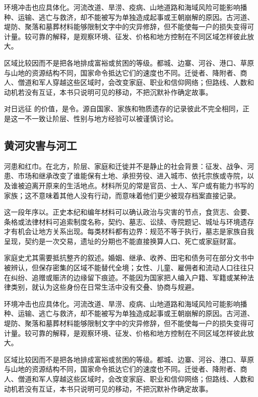 环境冲击也应具体化。河流改道、旱涝、疫病、山地道路和海域风险可能影响播种、运输、逃亡与救济，却不能被写为单独造成起事或王朝崩解的原因。古河道、堤防、聚落和墓葬材料能够限制文字中的灾异修辞，但不能使每一户的损失变得可计量。较可靠的解释，是观察环境、征发、价格和地方控制在不同区域怎样彼此放大。

区域比较因而不是把各地排成富裕或贫困的等级。都城、边寨、河谷、港口、草原与山地的资源结构不同，国家命令抵达它们的速度也不同。迁徙者、降附者、商人、僧道和军人穿越这些区域时，会改变家庭、职业和信仰网络；但路线、人数和动机若没有互证，本书只说明可见的移动，不把沉默补作确定故事。

对日远征 的价值，是令。源自国家、家族和物质遗存的记录彼此不完全相同，正是这一不一致让阶层、性别与地方经验可以被谨慎讨论。

\subsection{黄河灾害与河工}

河患和红巾。在北方，阶层、家庭和迁徙并不是静止的社会背景：征发、战争、河患、市场和继承改变了谁能保有土地、承担劳役、进入城市、依托宗族或寺院，以及谁被迫离开原来的生活地点。材料所见的常是官员、士人、军户或有能力书写的家族；这不意味着其他人没有行动，而意味着他们更少被现存档案直接记录。

这一段年序以。正史本纪和编年材料可以确认政治与灾害的节点，食货志、会要、条格或法律材料可追索制度名称，契约、墓志、讼牍、寺院题记、城址与环境遗存才有机会让地方关系出现。每类材料都有边界：规范不等于执行，墓志是家族自我呈现，契约是一次交易，遗址的分期也不能直接换算人口、死亡或家庭财富。

家庭史尤其需要抵抗整齐的叙述。婚姻、继承、收养、田宅和债务可在部分文书中被辨认，但保存密集的区域不能替代全境；女性、儿童、雇佣者和流动人口往往只在纠纷、追赠或赈济的边缘留下痕迹。不能因为国家把人编入户籍、军籍或某种法律类别，就认为这些身份在日常生活中没有交叠、协商与规避。

环境冲击也应具体化。河流改道、旱涝、疫病、山地道路和海域风险可能影响播种、运输、逃亡与救济，却不能被写为单独造成起事或王朝崩解的原因。古河道、堤防、聚落和墓葬材料能够限制文字中的灾异修辞，但不能使每一户的损失变得可计量。较可靠的解释，是观察环境、征发、价格和地方控制在不同区域怎样彼此放大。

区域比较因而不是把各地排成富裕或贫困的等级。都城、边寨、河谷、港口、草原与山地的资源结构不同，国家命令抵达它们的速度也不同。迁徙者、降附者、商人、僧道和军人穿越这些区域时，会改变家庭、职业和信仰网络；但路线、人数和动机若没有互证，本书只说明可见的移动，不把沉默补作确定故事。

